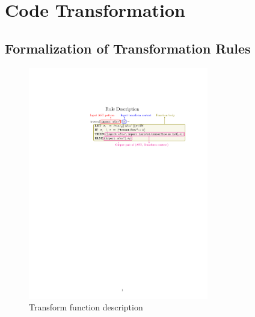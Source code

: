 \section{Code Transformation}\label{sec:trans}

\subsection{Formalization of Transformation Rules}

\begin{figure}[ht!]
    \centering
    \includegraphics[width=0.7\textwidth]{transfn_expl.pdf}
    \caption{Transform function description}
    \label{fig:trans:fnexpl}
\end{figure}

